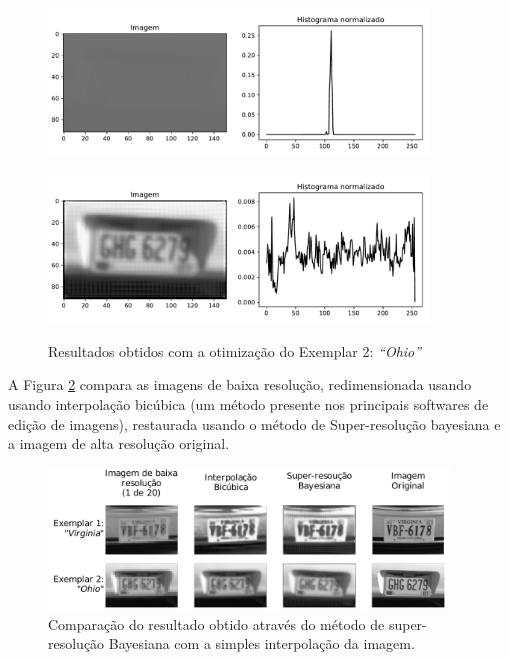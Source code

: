 \begin{figure}
	\centering
	\caption{Resultados obtidos com a otimização do Exemplar 2: \emph{``Ohio''}}
	\label{fig:result_histograms1}
	\begin{minipage}[b]{.99\linewidth}
		\includegraphics[width = 0.9\textwidth]{./figures/results_figures/histograma2.pdf}
		\label{fig:result_histograms1_output}
	\end{minipage}	

	\begin{minipage}[b]{.99\linewidth}
		\includegraphics[width = 0.9\textwidth]{./figures/results_figures/histograma1.pdf}
		\label{fig:result_histograms1_equalized}
	\end{minipage}	
	
\end{figure}

A Figura \ref{fig:results_compare} compara as imagens de baixa resolução, redimensionada usando usando interpolação bicúbica (um método presente nos principais softwares de edição de imagens), restaurada usando o método de Super-resolução bayesiana e a imagem de alta resolução original.

\begin{figure}
	\centering
	\caption{Comparação do resultado obtido através do método de super-resolução Bayesiana com a simples interpolação da imagem.}
	\label{fig:results_compare}
	\includegraphics[width = 0.95\textwidth]{./figures/results_figures/result_compare.pdf}
\end{figure}

